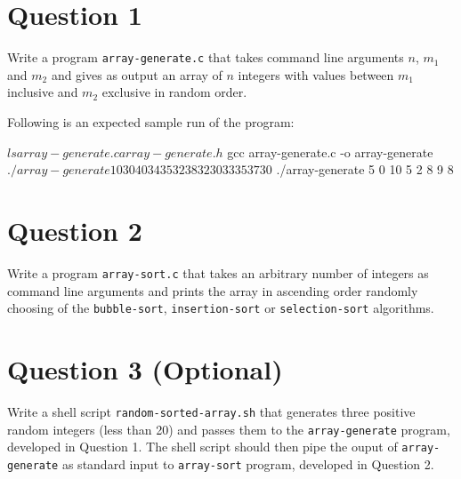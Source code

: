 \documentclass[12pt,letterpaper,twoside]{article}
\begin{document}


\section*{Question 1}

Write a program \texttt{array-generate.c} that takes command line arguments $n$, $m_1$ and $m_2$ and gives as output an array of $n$ integers with values between $m_1$ inclusive and $m_2$ exclusive in random order.

Following is an expected sample run of the program:

\begin{terminal}
$ ls
array-generate.c array-generate.h
$ gcc array-generate.c -o array-generate
$ ./array-generate 10 30 40
34 35 32 38 32 30 33 35 37 30
$ ./array-generate 5 0 10
5 2 8 9 8
\end{terminal}

\section*{Question 2}

Write a program \texttt{array-sort.c} that takes an arbitrary number of integers as command line arguments and prints the array in ascending order randomly choosing of the \texttt{bubble-sort}, \texttt{insertion-sort} or \texttt{selection-sort} algorithms.


\section*{Question 3 (Optional)}

Write a shell script \texttt{random-sorted-array.sh} that generates three positive random integers (less than 20) and passes them to the \texttt{array-generate} program, developed in Question 1.
The shell script should then pipe the ouput of \texttt{array-generate} as standard input to \texttt{array-sort} program, developed in Question 2.
\end{document}
